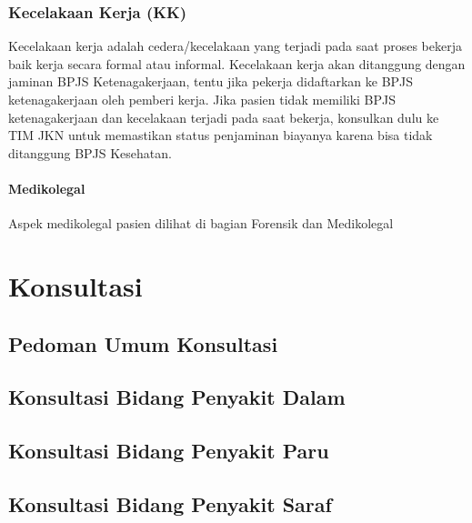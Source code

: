 \documentclass[
]{book}
\begin{document}
\hypertarget{kecelakaan-kerja-kk}{%
\subsection{Kecelakaan Kerja (KK)}\label{kecelakaan-kerja-kk}}

Kecelakaan kerja adalah cedera/kecelakaan yang terjadi pada saat proses bekerja baik kerja secara formal atau informal.
Kecelakaan kerja akan ditanggung dengan jaminan BPJS Ketenagakerjaan, tentu jika pekerja didaftarkan ke BPJS ketenagakerjaan oleh pemberi kerja. Jika pasien tidak memiliki BPJS ketenagakerjaan dan kecelakaan terjadi pada saat bekerja, konsulkan dulu ke TIM JKN untuk memastikan status penjaminan biayanya karena bisa tidak ditanggung BPJS Kesehatan.

\hypertarget{medikolegal}{%
\subsubsection{Medikolegal}\label{medikolegal}}

Aspek medikolegal pasien dilihat di bagian Forensik dan Medikolegal

\hypertarget{konsultasi}{%
\chapter{Konsultasi}\label{konsultasi}}

\hypertarget{pedoman-umum-konsultasi}{%
\section{Pedoman Umum Konsultasi}\label{pedoman-umum-konsultasi}}

\hypertarget{konsultasi-bidang-penyakit-dalam}{%
\section{Konsultasi Bidang Penyakit Dalam}\label{konsultasi-bidang-penyakit-dalam}}

\hypertarget{konsultasi-bidang-penyakit-paru}{%
\section{Konsultasi Bidang Penyakit Paru}\label{konsultasi-bidang-penyakit-paru}}

\hypertarget{konsultasi-bidang-penyakit-saraf}{%
\section{Konsultasi Bidang Penyakit Saraf}\label{konsultasi-bidang-penyakit-saraf}}
\end{document}

